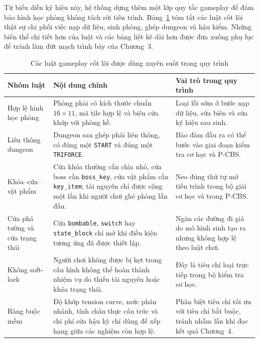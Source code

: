 \documentclass[oneside,a4paper,12pt]{extreport}
\begin{document}
Từ biểu diễn ký hiệu này, hệ thống dựng thêm một lớp quy tắc gameplay để đảm bảo hình
học phòng không tách rời tiến trình. Bảng~\ref{tab:core_game_rules_ch3} tóm tắt các
luật cốt lõi thật sự chi phối việc nạp dữ liệu, sinh phòng, ghép dungeon và hậu kiểm.
Những biến thể chi tiết hơn của luật và các bảng liệt kê dài hơn được đưa xuống phụ
lục để tránh làm đứt mạch trình bày của Chương~3.

\begin{table}[H]
\centering
\footnotesize
\caption{Các luật gameplay cốt lõi được dùng xuyên suốt trong quy trình}
\label{tab:core_game_rules_ch3}
\begin{tabular}{>{\raggedright\arraybackslash}p{2.8cm} >{\raggedright\arraybackslash}p{5.2cm} >{\raggedright\arraybackslash}p{5.8cm}}
\toprule
Nhóm luật & Nội dung chính & Vai trò trong quy trình \\
\midrule
Hợp lệ hình học phòng & Phòng phải có kích thước chuẩn $16\times 11$, mã tile hợp lệ và biên cửa khớp với phòng kề. & Loại lỗi sớm ở bước nạp dữ liệu, sửa biên và sửa ký hiệu sau sinh. \\
Liên thông dungeon & Dungeon sau ghép phải liên thông, có đúng một \texttt{START} và đúng một \texttt{TRIFORCE}. & Bảo đảm đầu ra có thể bước vào giai đoạn kiểm tra cơ học và P-CBS. \\
Khóa--cửa--vật phẩm & Cửa khóa thường cần chìa nhỏ, cửa boss cần \texttt{boss\_key}, cửa vật phẩm cần \texttt{key\_item}; tài nguyên chỉ được cộng một lần khi người chơi ghé phòng lần đầu. & Neo đúng thứ tự mở tiến trình trong bộ giải cơ học và trong P-CBS. \\
Cửa phá tường và cửa trạng thái & Cửa \texttt{bombable}, \texttt{switch} hay \texttt{state\_block} chỉ mở khi điều kiện tương ứng đã được thiết lập. & Ngăn các đường đi giả do mô hình sinh tạo ra nhưng không hợp lệ theo luật chơi. \\
Không soft-lock & Người chơi không được bị kẹt trong cấu hình không thể hoàn thành nhiệm vụ do thiếu tài nguyên hoặc khóa trạng thái. & Đây là tiêu chí loại trực tiếp trong bộ kiểm tra cơ học. \\
Ràng buộc mềm & Độ khớp tension curve, mức phân nhánh, tính chân thực cấu trúc và chi phí sửa hậu kỳ chỉ dùng để xếp hạng giữa các nghiệm còn hợp lệ. & Phân biệt tiêu chí tối ưu với tiêu chí bắt buộc, tránh nhầm lẫn khi đọc kết quả Chương~4. \\
\bottomrule
\end{tabular}
\end{table}
\end{document}
